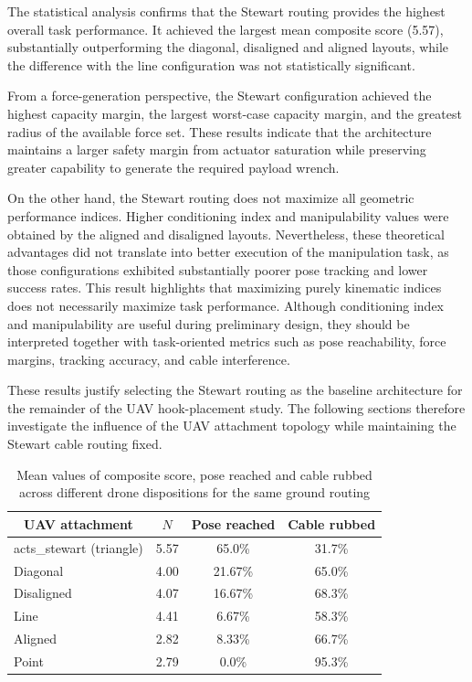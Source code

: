 The statistical analysis confirms that the Stewart routing provides the highest overall task performance. It achieved the largest mean composite score (5.57), substantially outperforming the diagonal, disaligned and aligned layouts, while the difference with the line configuration was not statistically significant. 

From a force-generation perspective, the Stewart configuration achieved the highest capacity margin, the largest worst-case capacity margin, and the greatest radius of the available force set. These results indicate that the architecture maintains a larger safety margin from actuator saturation while preserving greater capability to generate the required payload wrench.

On the other hand, the Stewart routing does not maximize all geometric performance indices. Higher conditioning index and manipulability values were obtained by the aligned and disaligned layouts. Nevertheless, these theoretical advantages did not translate into better execution of the manipulation task, as those configurations exhibited substantially poorer pose tracking and lower success rates. This result highlights that maximizing purely kinematic indices does not necessarily maximize task performance. Although conditioning index and manipulability are useful during preliminary design, they should be interpreted together with task-oriented metrics such as pose reachability, force margins, tracking accuracy, and cable interference.

These results justify selecting the Stewart routing as the baseline architecture for the remainder of the UAV hook-placement study. The following sections therefore investigate the influence of the UAV attachment topology while maintaining the Stewart cable routing fixed.

\begin{table}[h]
    \centering
\begin{tabular}{lccc}
\hline
\multicolumn{1}{c}{\textbf{UAV attachment}} & \multicolumn{1}{c}{\textbf{$N$}} & \multicolumn{1}{c}{\textbf{Pose reached}} & \multicolumn{1}{c}{\textbf{Cable rubbed}} \\ \hline
acts\_stewart (triangle) & 5.57   & 65.0\%   & 31.7\%    \\
Diagonal                 & 4.00   & 21.67\%   & 65.0\%    \\
Disaligned               & 4.07   & 16.67\%   & 68.3\%    \\
Line                     & 4.41   & 6.67\%    & 58.3\%    \\
Aligned                  & 2.82   & 8.33\%    & 66.7\%    \\
Point                    & 2.79   & 0.0\%    & 95.3\%    \\ \hline
\end{tabular}
\caption{Mean values of composite score, pose reached and cable rubbed across different drone dispositions for the same ground routing}
\label{tab:meanValuesStewart}
\end{table}

